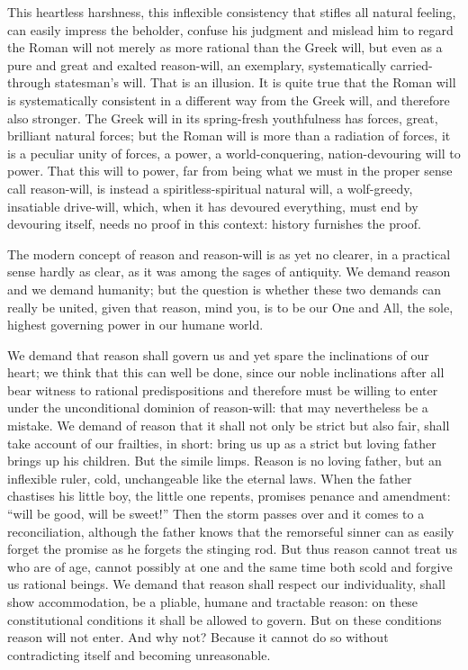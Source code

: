 \documentclass[12pt,a4paper,openany]{book}
\newcommand{\opage}[1]{\marginnote{\footnotesize\textit{[#1]}}}
\begin{document}
This heartless harshness, this inflexible consistency that stifles all natural feeling, can easily impress the beholder,
confuse his judgment and mislead him to regard the Roman will not merely as more rational than the Greek will, but even as a
pure and great and exalted reason-will, an exemplary, systematically carried-through statesman's will. That is an illusion.
It is quite true that the Roman will is systematically consistent in a different way from the Greek will, and therefore also
stronger. The Greek will in its spring-fresh youthfulness has forces, great, brilliant natural forces; but the Roman will is
more than a radiation of forces, it is a peculiar unity of forces, a power, a world-conquering, nation-devouring will to
power. That this will to power, far from being what we must in the proper sense call reason-will, is instead a spiritless-spiritual
natural will, a wolf-greedy, insatiable drive-will, which, when it has devoured everything, must end by devouring itself,
needs no proof in this context: history furnishes the proof.

The modern concept of reason and reason-will is as yet no clearer, in a practical sense hardly as clear, as it was
among the sages of antiquity. We demand reason and
\setcounter{footnote}{0}%
\opage{27}we demand humanity; but the question is whether these two demands can really be united, given that reason, mind you,
is to be our One and All, the sole, highest governing power in our humane world.

We demand that reason shall govern us and yet spare the inclinations of our heart; we think that this can well be done,
since our noble inclinations after all bear witness to rational predispositions and therefore must be willing to enter under
the unconditional dominion of reason-will: that may nevertheless be a mistake. We demand of reason that it shall not only be
strict but also fair, shall take account of our frailties, in short: bring us up as a strict but loving father brings up his
children. But the simile limps. Reason is no loving father, but an inflexible ruler, cold, unchangeable like the eternal
laws. When the father chastises his little boy, the little one repents, promises penance and amendment: ``will be good, will
be sweet!'' Then the storm passes over and it comes to a reconciliation, although the father knows that the remorseful
sinner can as easily forget the promise as he forgets the stinging rod. But thus reason cannot treat %
us who are of age, cannot possibly at one and the same time both scold and forgive us rational beings. We demand that reason
shall respect our individuality, shall show accommodation, be a pliable, humane and tractable reason: on these constitutional
conditions it shall be allowed to govern. But on these conditions reason will not enter. And why not? Because it cannot do so
without contradicting itself and becoming unreasonable.
\end{document}
